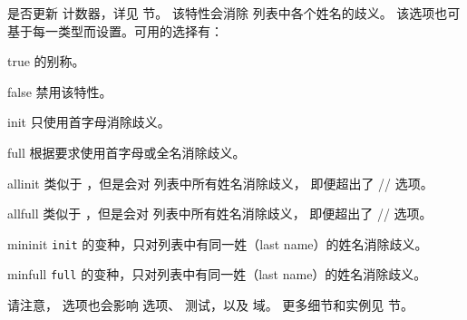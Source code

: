 \begin{optionlist}
是否更新  计数器，详见  节。
该特性会消除  列表中各个姓名的歧义。
该选项也可基于每一类型而设置。可用的选择有：

\begin{valuelist}
\item[true] %
 的别称。
\item[false] %
禁用该特性。
\item[init] %
只使用首字母消除歧义。
\item[full] %
根据要求使用首字母或全名消除歧义。
\item[allinit] %
类似于 ，但是会对  列表中所有姓名消除歧义，
即便超出了 \slash {}\slash {} 选项。
\item[allfull] %
类似于 ，但是会对  列表中所有姓名消除歧义，
即便超出了 \slash {}\slash {} 选项。
\item[mininit] %
\texttt{init} 的变种，只对列表中有同一姓（last name）的姓名消除歧义。
\item[minfull] %
\texttt{full} 的变种，只对列表中有同一姓（last name）的姓名消除歧义。
\end{valuelist}
%
请注意， 选项也会影响  选项、
 测试，以及  域。
更多细节和实例见  节。




\end{optionlist}
